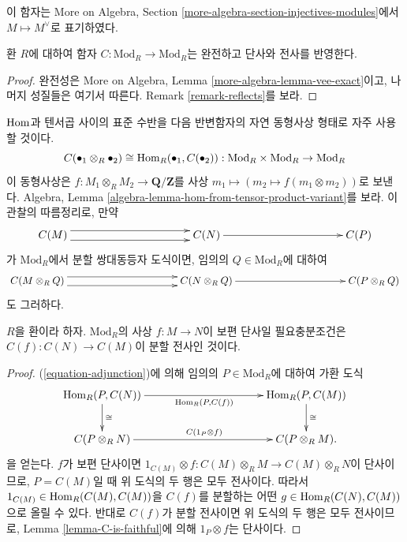 \noindent
이 함자는 More on Algebra, Section
\ref{more-algebra-section-injectives-modules}에서 $M \mapsto M^\vee$로
표기하였다.

\begin{lemma}
\label{lemma-C-is-faithful}
환 $R$에 대하여 함자 $C : \text{Mod}_R \to \text{Mod}_R$는 완전하고
단사와 전사를 반영한다.
\end{lemma}

\begin{proof}
완전성은 More on Algebra, Lemma \ref{more-algebra-lemma-vee-exact}이고,
나머지 성질들은 여기서 따른다. Remark \ref{remark-reflects}를 보라.
\end{proof}

\begin{remark}
\label{remark-adjunction}
$\mathop{\mathrm{Hom}}\nolimits$과 텐서곱 사이의 표준 수반을 다음 반변함자의 자연 동형사상 형태로
자주 사용할 것이다.
\begin{equation}
\label{equation-adjunction}
C(\bullet_1 \otimes_R \bullet_2) \cong \mathop{\mathrm{Hom}}\nolimits_R(\bullet_1, C(\bullet_2)): 
\text{Mod}_R \times \text{Mod}_R \to \text{Mod}_R
\end{equation}
이 동형사상은 $f: M_1 \otimes_R M_2 \to \mathbf{Q}/\mathbf{Z}$를 사상
$m_1 \mapsto (m_2 \mapsto f(m_1 \otimes m_2))$로 보낸다. Algebra, Lemma
\ref{algebra-lemma-hom-from-tensor-product-variant}를 보라. 이 관찰의
따름정리로, 만약
$$
\xymatrix@C=9pc{
C(M) \ar@<1ex>[r] \ar@<-1ex>[r] & C(N) \ar[r] & C(P)
}
$$
가 $\text{Mod}_R$에서 분할 쌍대동등자 도식이면, 임의의
$Q \in \text{Mod}_R$에 대하여
$$
\xymatrix@C=9pc{
C(M \otimes_R Q) \ar@<1ex>[r] \ar@<-1ex>[r] & C(N \otimes_R Q) \ar[r] & C(P 
\otimes_R Q)
}
$$
도 그러하다.
\end{remark}

\begin{lemma}
\label{lemma-split-surjection}
$R$을 환이라 하자. $\text{Mod}_R$의 사상 $f: M \to N$이 보편 단사일
필요충분조건은 $C(f): C(N) \to C(M)$이 분할 전사인 것이다.
\end{lemma}

\begin{proof}
(\ref{equation-adjunction})에 의해 임의의 $P \in \text{Mod}_R$에 대하여
가환 도식
$$
\xymatrix@C=9pc{
\Hom_R( P, C(N)) \ar[r]_{\Hom_R(P,C(f))} \ar[d]^{\cong} &
\Hom_R(P,C(M)) \ar[d]^{\cong} \\
C(P \otimes_R N ) \ar[r]^{C(1_{P} \otimes f)} & C(P \otimes_R M ).
}
$$
을 얻는다. $f$가 보편 단사이면
$1_{C(M)} \otimes f: C(M) \otimes_R M \to C(M) \otimes_R N$이 단사이므로,
$P = C(M)$일 때 위 도식의 두 행은 모두 전사이다. 따라서
$1_{C(M)} \in \mathop{\mathrm{Hom}}\nolimits_R(C(M), C(M))$을 $C(f)$를 분할하는 어떤
$g \in \mathop{\mathrm{Hom}}\nolimits_R(C(N), C(M))$으로 올릴 수 있다. 반대로 $C(f)$가 분할
전사이면 위 도식의 두 행은 모두 전사이므로, Lemma
\ref{lemma-C-is-faithful}에 의해 $1_{P} \otimes f$는 단사이다.
\end{proof}

